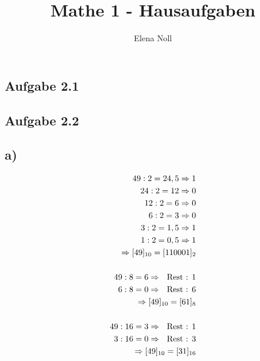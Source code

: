 \documentclass[12pt,a4paper]{article}
\author{Elena Noll}
\title{Mathe 1 - Hausaufgaben}
\begin{document}
\maketitle

\subsection*{Aufgabe 2.1}

\subsection*{Aufgabe 2.2}
\subsection*{a)}
\begin{align*}
49 : 2 = 24,5 \Rightarrow 1 \\
24 : 2 = 12 \Rightarrow 0 \\
12 : 2 = 6 \Rightarrow 0 \\
6 : 2 = 3 \Rightarrow 0 \\
3 : 2 = 1,5 \Rightarrow 1 \\
1 : 2 = 0,5 \Rightarrow 1 \\
\Rightarrow [49]_{10} = [110001]_{2} \\
\\
49 : 8 = 6 \Rightarrow \textrm{ \textrm{ Rest }: } 1 \\
6 : 8 = 0 \Rightarrow \textrm{ \textrm{ Rest }: } 6 \\
\Rightarrow [49]_{10} = [61]_{8} \\
\\
49 : 16 = 3 \Rightarrow \textrm{ \textrm{ Rest }: } 1 \\
3 : 16 = 0 \Rightarrow \textrm{ \textrm{ Rest }: } 3 \\
\Rightarrow [49]_{10} = [31]_{16}
\end{align*}
\end{document}
